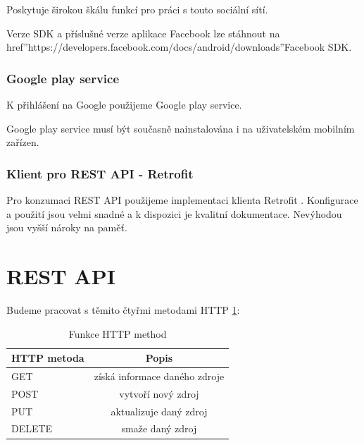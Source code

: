 \documentclass[thesis=B,czech]{FITthesis}[2012/06/26]
\begin{document}
Poskytuje širokou škálu funkcí pro práci s touto sociální sítí. 

Verze SDK a příslušné verze aplikace Facebook lze stáhnout na
href{''https://developers.facebook.com/docs/android/downloads''}{Facebook SDK}.

\subsubsection {Google play service}
\label{technology:google_play_service}

K přihlášení na Google použijeme Google play service\cite{design_google_play_service}.

Google play service musí být současně nainstalována i na uživatelském mobilním zařízen\cite{design_google_play_service_need}.

\subsubsection {Klient pro REST API - Retrofit}
\label{technology:android_client_for_restapi}

Pro konzumaci REST API použijeme implementaci klienta Retrofit \cite{design_android_retrofit}. Konfigurace a použití jsou velmi snadné a k dispozici je kvalitní dokumentace. Nevýhodou jsou vyšší nároky na paměť\cite{design_android_retrofit_benefit}.  	

\section{REST API}
\label{rest_api_design}

Budeme pracovat s těmito čtyřmi metodami HTTP \ref{tab:RESTfulAPI_definice}:

\begin{table}[!h]\centering
\caption{Funkce HTTP method}\label{tab:RESTfulAPI_definice}
	\begin{tabular}{l c}
		\toprule
		\textbf{HTTP metoda} & \textbf{Popis} \\ \midrule \midrule
		GET & získá informace daného zdroje  \\ \midrule	
		POST & vytvoří nový zdroj\\ \midrule
		PUT & aktualizuje daný zdroj  \\ \midrule
		DELETE & smaže daný zdroj \\ \bottomrule
	\end{tabular}
\end{table}
\end{document}
